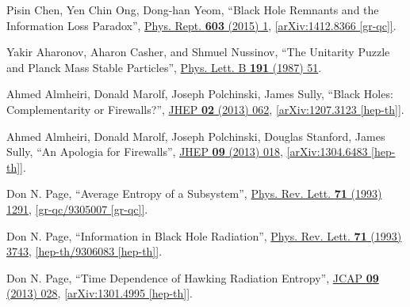 \documentclass[12pt,preprintnumbers, floatfix, preprintnumbers, letterpaper, superscriptaddress,nofootinbib]{revtex4-2}
\begin{document}
\begin{thebibliography}{99}

Pisin Chen, Yen Chin Ong, Dong-han Yeom, ``Black Hole Remnants and the Information Loss Paradox'', {\hypersetup{urlcolor=vividviolet}\href{https://www.sciencedirect.com/science/article/abs/pii/S0370157315004391?via\%3Dihub}{Phys. Rept. \textbf{603} (2015) 1}}, \href{https://arxiv.org/abs/1412.8366}{[arXiv:1412.8366 [gr-qc]]}.

 Yakir Aharonov, Aharon Casher, and Shmuel Nussinov, ``The Unitarity Puzzle and Planck Mass Stable Particles'', {\hypersetup{urlcolor=vividviolet}\href{https://www.sciencedirect.com/science/article/abs/pii/0370269387913207?via\%3Dihub}{Phys. Lett. B \textbf{191} (1987) 51}}.

 Ahmed Almheiri, Donald Marolf, Joseph Polchinski, James Sully, ``Black Holes: Complementarity or Firewalls?'', {\hypersetup{urlcolor=vividviolet}\href{https://doi.org/10.1007/JHEP02(2013)062}{JHEP \textbf{02} (2013) 062}}, \href{https://arxiv.org/abs/1207.3123}{[arXiv:1207.3123 [hep-th]]}.

Ahmed Almheiri, Donald Marolf, Joseph Polchinski, Douglas Stanford, James Sully, ``An Apologia for Firewalls'',  {\hypersetup{urlcolor=vividviolet}\href{https://link.springer.com/article/10.1007/JHEP09(2013)018}{JHEP \textbf{09} (2013) 018}}, \href{https://arxiv.org/abs/1304.6483}{[arXiv:1304.6483 [hep-th]]}.

Don N. Page, ``Average Entropy of a Subsystem'', {\hypersetup{urlcolor=vividviolet}\href{https://doi.org/10.1103/PhysRevLett.71.1291}{Phys. Rev. Lett. \textbf{71} (1993) 1291}}, \href{https://arxiv.org/abs/gr-qc/9305007}{[gr-qc/9305007 [gr-qc]]}.

Don N. Page, ``Information in Black Hole Radiation'',  {\hypersetup{urlcolor=vividviolet}\href{https://doi.org/10.1103/PhysRevLett.71.3743}{Phys. Rev. Lett. \textbf{71} (1993) 3743}}, \href{https://arxiv.org/abs/hep-th/9306083}{[hep-th/9306083 [hep-th]]}.

Don N. Page, ``Time Dependence of Hawking Radiation Entropy'', {\hypersetup{urlcolor=vividviolet}\href{https://iopscience.iop.org/article/10.1088/1475-7516/2013/09/028}{JCAP \textbf{09} (2013) 028}}, \href{https://arxiv.org/abs/1301.4995}{[arXiv:1301.4995 [hep-th]]}.


\end{thebibliography}
\end{document}
